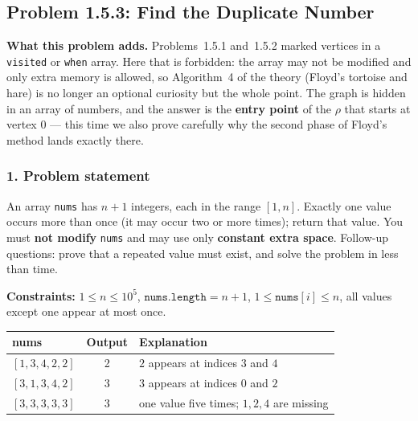 \subsection{Problem 1.5.3: Find the Duplicate Number}


\textbf{What this problem adds.} Problems~1.5.1 and~1.5.2 marked vertices in a \texttt{visited} or \texttt{when} array. Here that is forbidden: the array may not be modified and only  extra memory is allowed, so Algorithm~4 of the theory (Floyd's tortoise and hare) is no longer an optional curiosity but the whole point. The graph is hidden in an array of numbers, and the answer is the \textbf{entry point} of the $\rho$ that starts at vertex $0$ --- this time we also prove carefully why the second phase of Floyd's method lands exactly there.

\subsubsection*{1. Problem statement}

An array \texttt{nums} has $n+1$ integers, each in the range $[1, n]$. Exactly one value occurs more than once (it may occur two or more times); return that value. You must \textbf{not modify} \texttt{nums} and may use only \textbf{constant extra space}. Follow-up questions: prove that a repeated value must exist, and solve the problem in less than  time.

\textbf{Constraints:} $1 \le n \le 10^5$, \; $\texttt{nums.length} = n+1$, \; $1 \le \texttt{nums}[i] \le n$, \; all values except one appear at most once.

\begin{table}[H]
\centering\small
\begin{tabular}{@{}lcl@{}}
\toprule
\textbf{nums} & \textbf{Output} & \textbf{Explanation} \\
\midrule
$[1,3,4,2,2]$ & 2 & $2$ appears at indices $3$ and $4$ \\
$[3,1,3,4,2]$ & 3 & $3$ appears at indices $0$ and $2$ \\
$[3,3,3,3,3]$ & 3 & one value five times; $1, 2, 4$ are missing \\
\bottomrule
\end{tabular}
\end{table}

